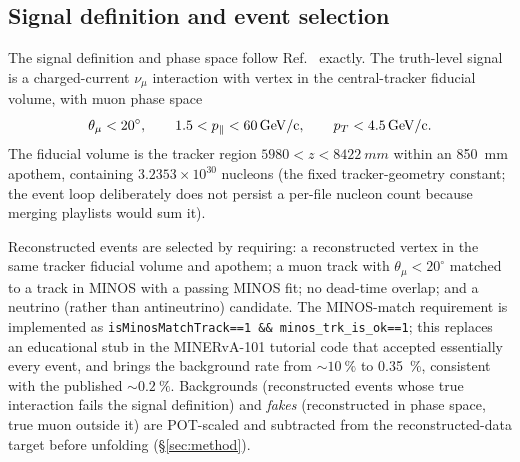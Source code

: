 \subsection{Signal definition and event selection}
\label{sec:selection}
The signal definition and phase space follow Ref.~\cite{MINERvA:2021owq}
exactly. The truth-level signal is a charged-current $\nu_\mu$ interaction
with vertex in the central-tracker fiducial volume, with muon phase space
\begin{equation*}
  \theta_\mu < 20^{\circ},\qquad
  1.5 < p_{\parallel} < \SI{60}{GeV/c},\qquad
  p_{T} < \SI{4.5}{GeV/c}.
\end{equation*}
The fiducial volume is the tracker region $5980 < z < \SI{8422}{mm}$ within an
\SI{850}{mm} apothem, containing $3.2353\times10^{30}$ nucleons (the fixed
tracker-geometry constant; the event loop deliberately does not persist a
per-file nucleon count because merging playlists would sum it).

Reconstructed events are selected by requiring: a reconstructed vertex in the
same tracker fiducial volume and apothem; a muon track with
$\theta_\mu<20^{\circ}$ matched to a track in MINOS with a passing MINOS fit;
no dead-time overlap; and a neutrino (rather than antineutrino) candidate.
The MINOS-match requirement is implemented as
\texttt{isMinosMatchTrack==1 \&\& minos\_trk\_is\_ok==1}; this replaces an
educational stub in the MINERvA-101 tutorial code that accepted essentially
every event, and brings the background rate from $\sim\SI{10}{\percent}$ to
\SI{0.35}{\percent}, consistent with the published
$\sim\SI{0.2}{\percent}$. Backgrounds (reconstructed events whose true
interaction fails the signal definition) and \emph{fakes} (reconstructed in
phase space, true muon outside it) are POT-scaled and subtracted from the
reconstructed-data target before unfolding (\S\ref{sec:method}).

